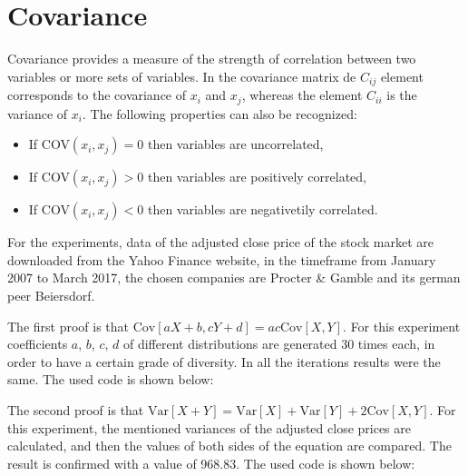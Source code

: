 \documentclass[10pt,leter,openany]{article}
\begin{document}
 
 \vspace{1cm}
 
  

\clearpage	
\section{Covariance}
Covariance provides a measure of the strength of correlation between two variables or more sets of variables. In the covariance matrix de $ C_{ij}$ element corresponds to the covariance of $ x_{i }$ and $ x_{j }$, whereas the element $ C_{ii} $ is the variance of $ x_{i} $. The following properties can also be recognized:
\begin{itemize}
	\item If COV$(x_{i},x_{j}) = 0$ then variables are uncorrelated,
	\item If COV$(x_{i},x_{j}) > 0$ then variables are positively correlated,
	\item If COV$(x_{i},x_{j}) < 0$ then variables are negativetily correlated.
\end{itemize}

For the experiments, data of the adjusted close price of the stock market are downloaded from the Yahoo Finance website, in the timeframe from January 2007 to March 2017, the chosen companies are Procter \& Gamble and its german peer Beiersdorf.

The first proof is that $\mbox{Cov}[aX+b, cY+d] = ac\mbox{Cov}[X,Y]$. For this experiment coefficients $a$, $b$, $c$, $d$ of different distributions are generated 30 times each, in order to have a certain grade of diversity. In all the iterations results were the same. The used code is shown below:



The second proof is that $\mbox{Var}[X+Y] = \mbox{Var}[X] + \mbox{Var}[Y] + 2\mbox{Cov}[X,Y]$. For this experiment, the mentioned variances of the adjusted close prices are calculated, and then the values of both sides of the equation are compared. The result is confirmed with a value of 968.83. The used code is shown below:



			
\clearpage

	
	
\end{document}
